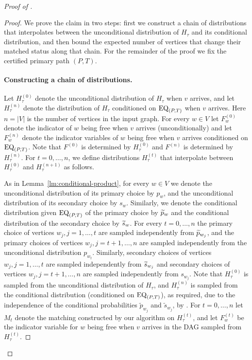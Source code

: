 \begin{proof}[Proof of ]
\begin{proof}	
We prove the claim in two steps: first we construct a chain of distributions that interpolates between the unconditional distribution of $H_\tau$ and its conditional distribution, and then bound the expected number of vertices that change their matched status along that chain. For the remainder of the proof we fix the certified primary path $(P,T)$.

\paragraph{Constructing a chain of distributions.} Let $H_\tau^{(0)}$ denote the unconditional distribution of $H_\tau$ when $v$ arrives, and let $H_\tau^{(n)}$ denote the distribution of $H_\tau$ conditioned on $\mathrm{EQ}_{(P,T)}$ when $v$ arrives. Here $n=|V|$ is the number of vertices in the input graph. For every $w\in V$ let $F^{(0)}_w$ denote the indicator of $w$ being free when $v$ arrives (unconditionally) and let $F^{(n)}_w$ denote the indicator variables of $w$ being free when $v$ arrives conditioned on $\mathrm{EQ}_{(P,T)}$. Note that $F^{(0)}$ is determined by $H^{(0)}_\tau$ and $F^{(n)}$ is determined by $H^{(n)}_\tau$.  For $t=0,\ldots, n$, we define distributions $H^{(t)}_\tau$ that interpolate between $H_\tau^{(0)}$ and $H_\tau^{(n+1)}$ as follows. 

As in Lemma~\ref{lm:conditional-product}, for every $w\in V$ we denote the unconditional distribution of its primary choice by $p_w$, and the unconditional distribution of its secondary choice by $s_w$. Similarly, we denote the conditional distribution given $\mathrm{EQ}_{(P,T)}$ of the primary choice by $\widetilde{p}_w$ and the conditional distribution of the secondary choice by $\widetilde{s}_w$. For every $t=0,\ldots, n$ the primary choice of vertices $w_j, j=1,\ldots, t$ are sampled independently from $\widetilde{p}_{w_j}$, and the primary choices of vertices $w_j, j=t+1,\ldots, n$ are sampled independently from the unconditional distribution $p_{w_t}$. Similarly, secondary choices of vertices $w_j, j=1,\ldots, t$ are sampled independently from $\widetilde{s}_{w_j}$ and secondary choices of vertices $w_j,j=t+1,\ldots, n$ are sampled independently from $s_{w_j}$. Note that $H^{(0)}_\tau$ is sampled from the unconditional distribution of $H_\tau$, and $H_\tau^{(n)}$ is sampled from the conditional distribution (conditioned on $\mathrm{EQ}_{(P,T)}$), as required, due to the independence of the conditional probabilities $\tilde{p}_{w_j}$ and $\tilde{s}_{w_j}$, by . For $t=0,\ldots, n$ let $M_t$ denote the matching constructed by our algorithm on $H_\tau^{(t)}$, and let $F^{(t)}_w$ be the indicator variable for $w$ being free when $v$ arrives in the DAG sampled from $H^{(t)}_\tau$.


\end{proof}
\end{proof}

